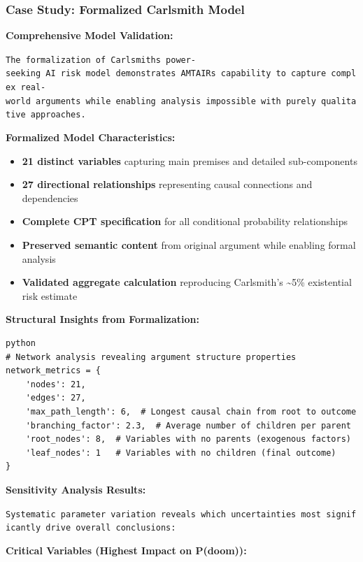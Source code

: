 \documentclass[
  11pt,
  letterpaper,
]{book}
\providecommand{\tightlist}{%
  \setlength{\itemsep}{0pt}\setlength{\parskip}{0pt}}
\begin{document}
\subsubsection{Case Study: Formalized Carlsmith
Model}\label{sec-carlsmith-case-study-2}

\textbf{Comprehensive Model Validation:}

\texttt{The\ formalization\ of\ Carlsmith\textquotesingle{}s\ power-seeking\ AI\ risk\ model\ demonstrates\ AMTAIR\textquotesingle{}s\ capability\ to\ capture\ complex\ real-world\ arguments\ while\ enabling\ analysis\ impossible\ with\ purely\ qualitative\ approaches.}

\textbf{Formalized Model Characteristics:}

\begin{itemize}
\tightlist
\item
  \textbf{21 distinct variables} capturing main premises and detailed
  sub-components
\item
  \textbf{27 directional relationships} representing causal connections
  and dependencies
\item
  \textbf{Complete CPT specification} for all conditional probability
  relationships
\item
  \textbf{Preserved semantic content} from original argument while
  enabling formal analysis
\item
  \textbf{Validated aggregate calculation} reproducing Carlsmith's
  \textasciitilde5\% existential risk estimate
\end{itemize}

\textbf{Structural Insights from Formalization:}

\begin{verbatim}
python
# Network analysis revealing argument structure properties
network_metrics = {
    'nodes': 21,
    'edges': 27, 
    'max_path_length': 6,  # Longest causal chain from root to outcome
    'branching_factor': 2.3,  # Average number of children per parent
    'root_nodes': 8,  # Variables with no parents (exogenous factors)
    'leaf_nodes': 1   # Variables with no children (final outcome)
}
\end{verbatim}

\textbf{Sensitivity Analysis Results:}

\texttt{Systematic\ parameter\ variation\ reveals\ which\ uncertainties\ most\ significantly\ drive\ overall\ conclusions:}

\textbf{Critical Variables (Highest Impact on P(doom)):}
\end{document}
